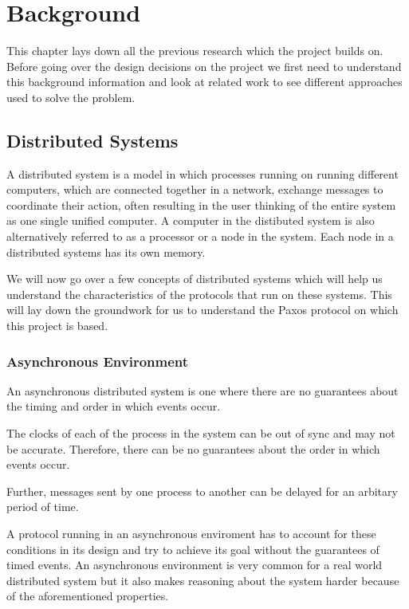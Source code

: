 \chapter{Background}
This chapter lays down all the previous research which the project builds on. Before
going over the design decisions on the project we first need to understand this
background information and look at related work to see different approaches used
to solve the problem.

\section{Distributed Systems}

A distributed system is a model in which processes running on running different
computers, which are connected together in a network, exchange messages to coordinate
their action, often resulting in the user thinking of the entire system as one single
unified computer. A computer in the distibuted system is also alternatively referred to as a
processor or a node in the system. Each node in a distributed systems has its
own memory.


We will now go over a few concepts of distributed systems which will help us understand
the characteristics of the protocols that run on these systems. This will lay down the
groundwork for us to understand the Paxos protocol on which this project is based.

\subsection{Asynchronous Environment}
An asynchronous distributed system is one where there are no guarantees about the
timing and order in which events occur.

The clocks of each of the process in the system can be out of sync and may not be
accurate. Therefore, there can be no guarantees about the order in which events occur.

Further, messages sent by one process to another can be delayed for an arbitary period of time.

A protocol running in an asynchronous enviroment has to account for these conditions
in its design and try to achieve its goal without the guarantees of timed events.
An asynchronous environment is very common for a real world distributed system but
it also makes reasoning about the system harder because of the aforementioned properties.

